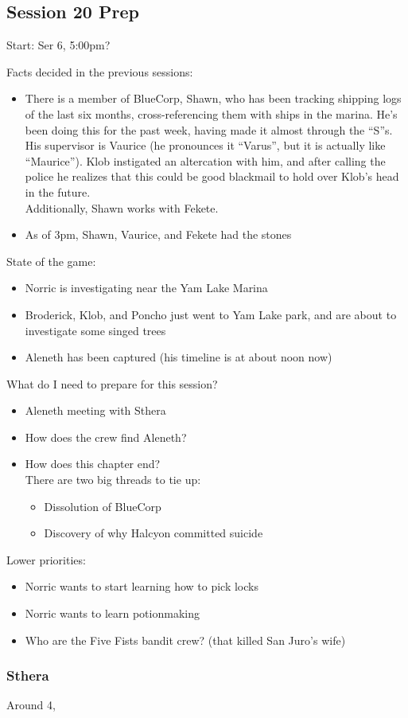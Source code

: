 \subsection{Session 20 Prep}
Start: Ser 6, 5:00pm?

Facts decided in the previous sessions:
\begin{itemize}
\item There is a member of BlueCorp, Shawn, who has been tracking shipping logs of the last six months, cross-referencing them with ships in the marina. He's been doing this for the past week, having made it almost through the ``S''s. His supervisor is Vaurice (he pronounces it ``Varus'', but it is actually like ``Maurice''). Klob instigated an altercation with him, and after calling the police he realizes that this could be good blackmail to hold over Klob's head in the future.\\
Additionally, Shawn works with Fekete.
\item As of 3pm, Shawn, Vaurice, and Fekete had the stones
\end{itemize}

State of the game:
\begin{itemize}
\item Norric is investigating near the Yam Lake Marina
\item Broderick, Klob, and Poncho just went to Yam Lake park, and are about to investigate some singed trees
\item Aleneth has been captured (his timeline is at about noon now)
\end{itemize}

What do I need to prepare for this session?
\begin{itemize}
\item Aleneth meeting with Sthera
\item How does the crew find Aleneth?

\item How does this chapter end?\\
There are two big threads to tie up:
\begin{itemize}
 \item Dissolution of BlueCorp
 \item Discovery of why Halcyon committed suicide
\end{itemize}
\end{itemize}

Lower priorities:
\begin{itemize}
\item Norric wants to start learning how to pick locks
\item Norric wants to learn potionmaking
\item Who are the Five Fists bandit crew? (that killed San Juro's wife)
\end{itemize}



\subsubsection{Sthera}
Around 4, 


